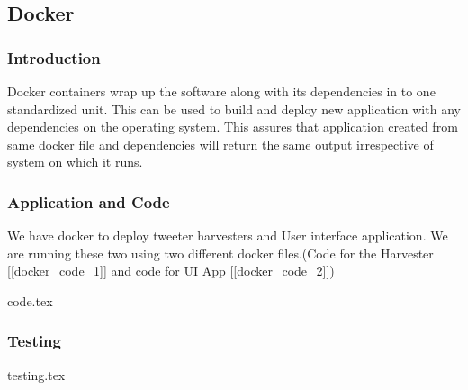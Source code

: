 \subsection{Docker} \label{docker}
\subsubsection{Introduction}
Docker containers wrap up the software along with its dependencies in to one standardized unit. This can be used to  build and deploy new application with any dependencies on the operating system. This assures that application created from same docker file and dependencies will return the same output irrespective of system on which it runs. 
\subsubsection{Application and Code}
We have docker to deploy tweeter harvesters and User interface application. We are running these two using two different docker files.(Code for the Harvester [\ref{docker_code_1}] and code for UI App [\ref{docker_code_2}])


{code.tex}

\subsubsection{Testing}
{testing.tex}



